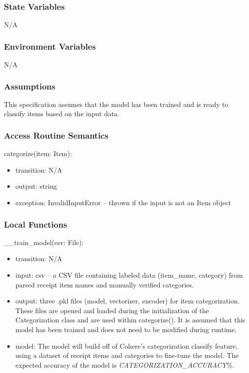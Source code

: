 \documentclass[12pt, titlepage]{article}
\begin{document}
\subsubsection{State Variables}
N/A

\subsubsection{Environment Variables}
N/A

\subsubsection{Assumptions}
This specification assumes that the model has been trained and is ready to
classify items based on the input data.

\subsubsection{Access Routine Semantics}

\noindent categorize(item: Item):
\begin{itemize}
\item transition: N/A 
\item output: string 
\item exception: InvalidInputError -- thrown if the input is not an Item object
\end{itemize}

\subsubsection{Local Functions}
\noindent \_\_train\_model(csv: File):
\begin{itemize}
  \item transition: N/A
  \item input: csv -- a CSV file containing labeled data (item\_name, category)
  from parsed receipt item names and manually verified categories.
  \item output: three .pkl files (model, vectorizer, encoder) for item
  categorization. These files are opened and loaded during the initialization of
  the Categorization class and are used within categorize(). It is assumed that
  this model has been trained and does not need to be modified during runtime.
  \item model: The model will build off of Cohere's categorization classify
  feature, using a dataset of receipt items and categories to fine-tune the
  model. The expected accuracy of the model is
  \textit{CATEGORIZATION\_ACCURACY}\%.
\end{itemize}
\end{document}
